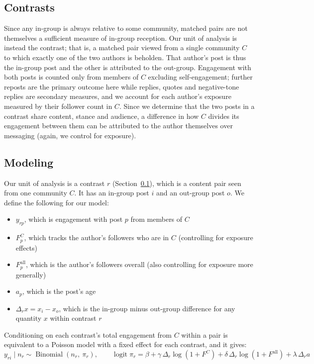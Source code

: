 \documentclass[11pt]{article}   %
\begin{document}
\subsection{Contrasts}\label{sec:contrasts}
Since any in-group is always relative to some community, matched pairs are not themselves a sufficient measure of in-group reception. 
Our unit of analysis is instead the contrast; that is, a matched pair viewed from a single community $C$ to which exactly one of the two authors is beholden. That author's post is thus the
in-group post and the other is attributed to the out-group. Engagement with both posts is counted only from members of $C$ excluding self-engagement; further reposts are the
primary outcome here while replies, quotes and negative-tone replies are secondary measures, and we account for each author's exposure measured by their follower count in $C$. Since we determine that the two
posts in a contrast share content, stance and audience, a difference in how $C$ divides its engagement between them can be attributed to the author themselves over messaging (again, we control for exposure).

\subsection{Modeling}\label{sec:modeling}
Our unit of analysis is a contrast $r$ (Section~\ref{sec:contrasts}), which is a content pair seen from one community $C$. 
It has an in-group post $i$ and an out-group post $o$. We define the following for our model:

\begin{itemize}
    \item $y_{rp}$, which is engagement with post $p$ from members of $C$
    \item $F^{C}_p$, which tracks the author's followers who are in $C$ (controlling for exposure effects)
    \item $F^{\text{all}}_p$, which is the author's followers overall (also controlling for exposure more generally)
    \item $a_p$, which is the post's age
    \item $\Delta_r x = x_i - x_o$, which is the in-group minus out-group difference for any quantity $x$ within contrast $r$
\end{itemize}

Conditioning on each contrast's total engagement from $C$ within a pair is equivalent to a Poisson model with a fixed effect for each contrast, and it gives:
\[
y_{ri} \mid n_r \sim \operatorname{Binomial}(n_r,\ \pi_r), \qquad
\operatorname{logit} \pi_r = \beta + \gamma\, \Delta_r \log\!\left(1 + F^{C}\right)
  + \delta\, \Delta_r \log\!\left(1 + F^{\text{all}}\right) + \lambda\, \Delta_r a
\]
\end{document}
